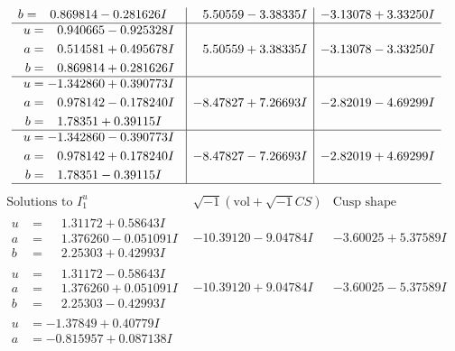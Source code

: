 \documentclass[1p]{elsarticle_modified}
\theoremstyle{definition}
\newcommand{\I}{\sqrt{-1}}
\begin{document}
$$\begin{array}{c|c|c}
\begin{aligned}
b &= \phantom{-}0.869814 - 0.281626 I\end{aligned}
 & \phantom{-}5.50559 - 3.38335 I & -3.13078 + 3.33250 I \\ \hline\begin{aligned}
u &= \phantom{-}0.940665 - 0.925328 I \\
a &= \phantom{-}0.514581 + 0.495678 I \\
b &= \phantom{-}0.869814 + 0.281626 I\end{aligned}
 & \phantom{-}5.50559 + 3.38335 I & -3.13078 - 3.33250 I \\ \hline\begin{aligned}
u &= -1.342860 + 0.390773 I \\
a &= \phantom{-}0.978142 - 0.178240 I \\
b &= \phantom{-}1.78351 + 0.39115 I\end{aligned}
 & -8.47827 + 7.26693 I & -2.82019 - 4.69299 I \\ \hline\begin{aligned}
u &= -1.342860 - 0.390773 I \\
a &= \phantom{-}0.978142 + 0.178240 I \\
b &= \phantom{-}1.78351 - 0.39115 I\end{aligned}
 & -8.47827 - 7.26693 I & -2.82019 + 4.69299 I\\
 \hline 
 \end{array}$$\newpage$$\begin{array}{c|c|c}  
\text{Solutions to }I^u_{1}& \I (\text{vol} + \sqrt{-1}CS) & \text{Cusp shape}\\
 \hline 
\begin{aligned}
u &= \phantom{-}1.31172 + 0.58643 I \\
a &= \phantom{-}1.376260 - 0.051091 I \\
b &= \phantom{-}2.25303 + 0.42993 I\end{aligned}
 & -10.39120 - 9.04784 I & -3.60025 + 5.37589 I \\ \hline\begin{aligned}
u &= \phantom{-}1.31172 - 0.58643 I \\
a &= \phantom{-}1.376260 + 0.051091 I \\
b &= \phantom{-}2.25303 - 0.42993 I\end{aligned}
 & -10.39120 + 9.04784 I & -3.60025 - 5.37589 I \\ \hline\begin{aligned}
u &= -1.37849 + 0.40779 I \\
a &= -0.815957 + 0.087138 I \\

\end{aligned}
\end{array}$$
\end{document}
